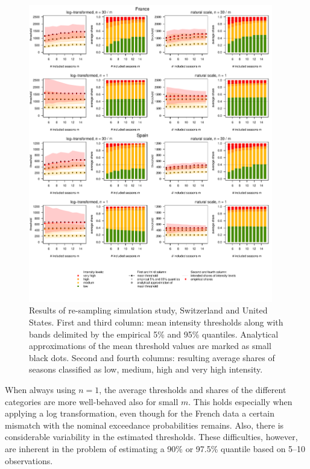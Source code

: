 \documentclass{article}
\begin{document}
\begin{figure}
\centering
\includegraphics[page=2, width=0.95\textwidth]{figure/plot_results.pdf}
\caption{Results of re-sampling simulation study, Switzerland and United States. First and third column: mean intensity thresholds along with bands delimited by the empirical 5\% and 95\% quantiles. Analytical approximations of the mean threshold values are marked as small black dots. Second and fourth columns: resulting average shares of seasons classified as low, medium, high and very high intensity.}
\label{fig:results2}
\end{figure}

When always using $n = 1$, the average thresholds and shares of the different categories are more well-behaved also for small $m$. This holds especially when applying a log transformation, even though for the French data a certain mismatch with the nominal exceedance probabilities remains. Also, there is considerable variability in the estimated thresholds. These difficulties, however, are inherent in the problem of estimating a 90\% or 97.5\% quantile based on 5--10 observations.
\end{document}
